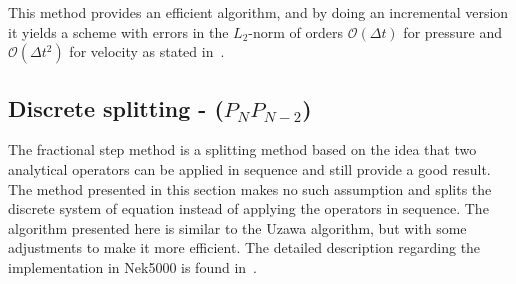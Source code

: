 This method provides an efficient algorithm, and by doing an incremental version 
it yields a scheme with errors in the $L_2$-norm of orders $\mathcal{O}(\Delta t)$ for
pressure and $\mathcal{O}(\Delta t ^2)$ for velocity as stated in~\cite{Guermond2006}.

\subsection{Discrete splitting - ($P_NP_{N-2}$)} \label{prescorr}
The fractional step method is a splitting method based on the idea that two analytical 
operators can be applied in sequence and still provide a good result. The method presented 
in this section makes no such assumption and splits the discrete system of equation instead 
of applying the operators in sequence. The algorithm presented here is similar to the Uzawa
algorithm, but with some adjustments to make it more efficient. The detailed 
description regarding the implementation in Nek5000 is found
in~\cite{Fischer_hybridschwarz-multigrid}.

